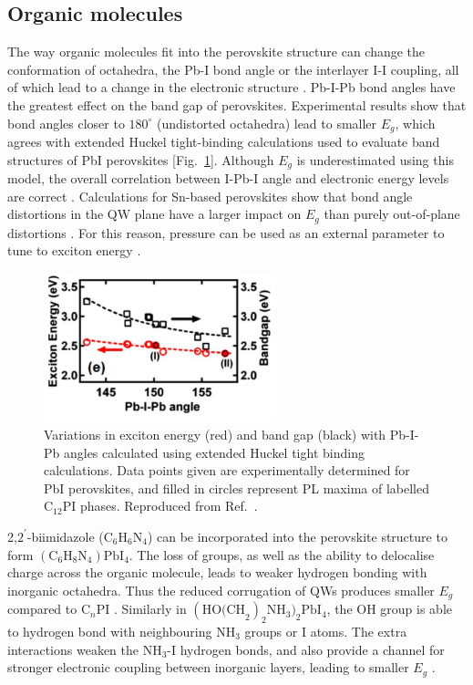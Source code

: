 \subsection{Organic molecules}
The way organic molecules fit into the perovskite structure can change the conformation of  octahedra, the Pb-I bond angle or the interlayer I-I coupling, all of which lead to a change in the electronic structure \cite{Sourisseau2007}. Pb-I-Pb bond angles have the greatest effect on the band gap of perovskites. Experimental results show that bond angles closer to $180^{\circ}$ (undistorted octahedra) lead to smaller $E_g$, which agrees with extended Huckel tight-binding calculations used to evaluate band structures of PbI perovskites [Fig.\ \ref{2Fig19}]. Although $E_g$ is underestimated using this model, the overall correlation between I-Pb-I angle and electronic energy levels are correct \cite{Pradeesh2009}. Calculations for Sn-based perovskites show that bond angle distortions in the QW plane have a larger impact on $E_g$ than purely out-of-plane distortions \cite{Knutson2005}. For this reason, pressure can be used as an external parameter to tune to exciton energy \cite{Matsuishi2001}.
\begin{figure}[h!]
\centering
\includegraphics[width=0.6\textwidth]{Fig19}
\caption{Variations in exciton energy (red) and band gap (black) with Pb-I-Pb angles calculated using extended Huckel tight binding calculations. Data points given are experimentally determined for PbI perovskites, and filled in circles represent PL maxima of labelled $\textrm{C}_{12}$PI phases. Reproduced from Ref.\ \cite{Pradeesh2009}.}
\label{2Fig19}
\end{figure}

2,$2^{'}$-biimidazole ($\textrm{C}_6\textrm{H}_6\textrm{N}_4$) can be incorporated into the perovskite structure to form $(\textrm{C}_6\textrm{H}_8\textrm{N}_4)\textrm{PbI}_4$. The loss of  groups, as well as the ability to delocalise charge across the organic molecule, leads to weaker hydrogen bonding with inorganic octahedra. Thus the reduced corrugation of QWs produces smaller $E_g$ compared to C$_n$PI \cite{Tang2001}. Similarly in $(\textrm{HO(CH}_2)_2\textrm{NH}_3)_2\textrm{PbI}_4$, the OH group is able to hydrogen bond with neighbouring $\textrm{NH}_3$ groups or I atoms. The extra interactions weaken the $\textrm{NH}_3$-I hydrogen bonds, and also provide a channel for stronger electronic coupling between inorganic layers, leading to smaller $E_g$ \cite{Mercier2004}.

